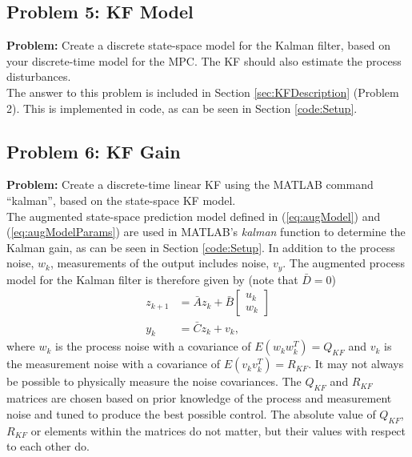 \documentclass[12pt]{article}
\begin{document}
\subsection{Problem 5: KF Model}

\textbf{Problem:} Create a discrete state-space model for the Kalman filter, based on your discrete-time model for the MPC. The KF should also estimate the process disturbances. \\

The answer to this problem is included in Section \ref{sec:KFDescription} (Problem 2). This is implemented in code, as can be seen in Section \ref{code:Setup}.

\subsection{Problem 6: KF Gain}

\textbf{Problem:} Create a discrete-time linear KF using the MATLAB command “kalman”, based on the state-space KF model. \\

The augmented state-space prediction model defined in (\ref{eq:augModel}) and (\ref{eq:augModelParams}) are used in MATLAB's \textit{kalman} function to determine the Kalman gain, as can be seen in Section \ref{code:Setup}. In addition to the process noise, $w_k$, measurements of the output includes noise, $v_y$. The augmented process model for the Kalman filter is therefore given by (note that $\bar{D}=0$)
\begin{subequations}
\begin{align}
z_{k+1} &= \bar{A}z_k + \bar{B} \begin{bmatrix} u_k \\ w_k \end{bmatrix} \\
y_k &= \bar{C}z_k + v_k,
\end{align} \label{eq:augModelwithNoise}
\end{subequations}
where $w_k$ is the process noise with a covariance of $E(w_k w_k^T)=Q_{KF}$ and $v_k$ is the measurement noise with a covariance of $E(v_k v_k^T)=R_{KF}$. It may not always be possible to physically measure the noise covariances. The $Q_{KF}$ and $R_{KF}$ matrices are chosen based on prior knowledge of the process and measurement noise and tuned to produce the best possible control. The absolute value of $Q_{KF}$, $R_{KF}$ or elements within the matrices do not matter, but their values with respect to each other do.
\end{document}
